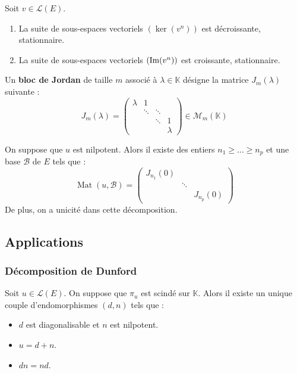   \begin{proposition}
    Soit $v \in \mathcal{L}(E)$.
    \begin{enumerate}[label=(\roman*)]
      \item La suite de sous-espaces vectoriels $(\ker(v^n))$ est décroissante, stationnaire.
      \item La suite de sous-espaces vectoriels $(\mathrm{Im}(v^n))$ est croissante, stationnaire.
    \end{enumerate}
  \end{proposition}


  \begin{definition}
    Un \textbf{bloc de Jordan} de taille $m$ associé à $\lambda \in \mathbb{K}$ désigne la matrice $J_m(\lambda)$ suivante :
    \[ J_m(\lambda) = \begin{pmatrix} \lambda & 1 & \\ & \ddots & \ddots & \\ & & \ddots & 1 \\ & & & \lambda \end{pmatrix} \in \mathcal{M}_m(\mathbb{K}) \]
  \end{definition}

  \begin{application}
    On suppose que $u$ est nilpotent. Alors il existe des entiers $n_1 \geq \dots \geq n_p$ et une base $\mathcal{B}$ de $E$ tels que :
    \[ \operatorname{Mat}(u, \mathcal{B}) = \begin{pmatrix} J_{n_1}(0) & & \\ & \ddots & \\ & & J_{n_p}(0) \end{pmatrix} \]
    De plus, on a unicité dans cette décomposition.
  \end{application}

  \subsection{Applications}

  \subsubsection{Décomposition de Dunford}


  \begin{theorem}
    Soit $u \in \mathcal{L}(E)$. On suppose que $\pi_u$ est scindé sur $\mathbb{K}$. Alors il existe un unique couple d'endomorphismes $(d, n)$ tels que :
    \begin{itemize}
      \item $d$ est diagonalisable et $n$ est nilpotent.
      \item $u = d + n$.
      \item $d n = n d$.
    \end{itemize}
  \end{theorem}

